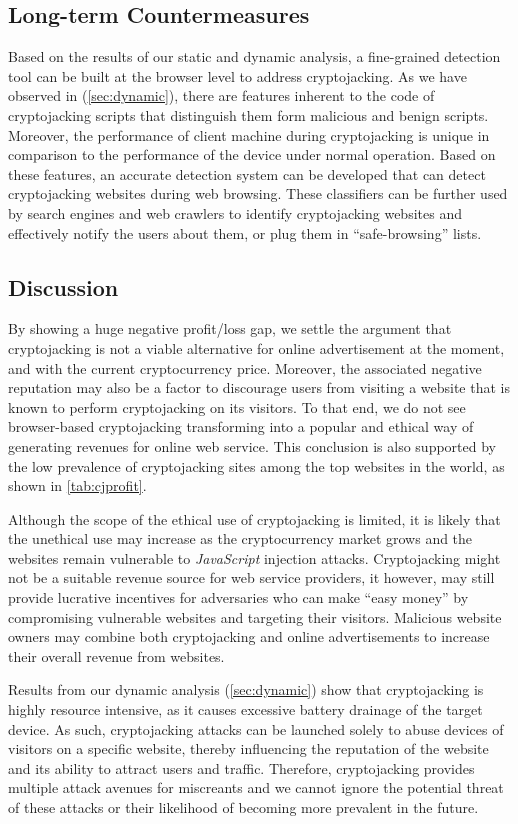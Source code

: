 \documentclass[acmlarge]{acmart}
\newcommand{\js}{{\em JavaScript}\xspace}
\newcommand{\cc}{{cryptocurrency}\xspace}
\newcommand{\cj}{cryptojacking\xspace}
\begin{document}
\subsection{Long-term Countermeasures} \label{sec:fd}
Based on the results of our static and dynamic analysis, a fine-grained detection tool can be built at the browser level to address \cj. As we have observed in (\textsection\ref{sec:dynamic}), there are features inherent to the code of \cj scripts that distinguish them form malicious and benign scripts. Moreover, the performance of client machine during \cj is unique in comparison to the performance of the device under normal operation. Based on these features, an accurate detection system can be developed that can detect \cj websites during web browsing. These classifiers can be further used by search engines and web crawlers to identify \cj websites and effectively notify the users about them, or plug them in ``safe-browsing'' lists. 
\subsection{Discussion} \label{sec:discussion} 

By showing a huge negative profit/loss gap, we settle the argument that \cj is not a viable alternative for online advertisement at the moment, and with the current cryptocurrency price. Moreover, the associated negative reputation may also be a factor to discourage users from visiting a website that is known to perform \cj on its visitors. To that end, we do not see browser-based \cj transforming into a popular and ethical way of generating revenues for online web service. This conclusion is also supported by the low prevalence of \cj sites among the top websites in the world, as shown in \autoref{tab:cjprofit}. 

Although the scope of the ethical use of \cj is limited, it is likely that the unethical use may increase as the \cc market grows and the websites remain vulnerable to \js injection attacks. Cryptojacking might not be a suitable revenue source for web service providers, it however, may still provide lucrative incentives for adversaries who can make ``easy money'' by compromising vulnerable websites and targeting their visitors. Malicious website owners may combine both \cj and online advertisements to increase their overall revenue from websites.  

Results from our dynamic analysis (\textsection\ref{sec:dynamic}) show that \cj is highly resource intensive, as it causes excessive battery drainage of the target device. As such, \cj attacks can be launched solely to abuse devices of visitors on a specific website, thereby influencing the reputation of the website and its ability to attract users and traffic. Therefore, \cj provides multiple attack avenues for miscreants and we cannot ignore the potential threat of these attacks or their likelihood of becoming more prevalent in the future. 
\end{document}
